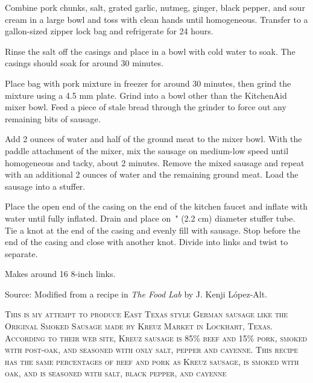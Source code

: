 \documentclass[letterpaper]{recipePMG}
\newcommand{\seveneights}{\nicefrac{7}{8} \,}
\begin{document}

Combine pork chunks, salt, grated garlic, nutmeg, ginger, black pepper, and sour cream in a large bowl and toss with clean hands until homogeneous. Transfer to a gallon-sized zipper lock bag and refrigerate for 24 hours.

Rinse the salt off the casings and place in a bowl with cold water to soak.  The casings should soak for around 30 minutes.

Place bag with pork mixture in freezer for around 30 minutes, then grind the mixture using a 4.5 mm plate. Grind into a bowl other than the KitchenAid mixer bowl. Feed a piece of stale bread through the grinder to force out any remaining bits of sausage. 


Add 2 ounces of water and half of the ground meat to the mixer bowl. With the paddle attachment of the mixer, mix the sausage on medium-low speed until homogeneous and tacky, about 2 minutes. Remove the mixed sausage and repeat with an additional 2 ounces of water and the remaining ground meat. Load the sausage into a stuffer. 

Place the open end of the casing on the end of the kitchen faucet and inflate with water until fully inflated. Drain and place on \seveneights" (2.2 cm) diameter stuffer tube. Tie a knot at the end of the casing and evenly fill with sausage. Stop before the end of the casing and close with another knot.  Divide into links and twist to separate. 

Makes around 16 8-inch links.

Source: Modified from a recipe in \textit{The Food Lab} by J. Kenji L\'{o}pez-Alt.

\newpage
{}
\label{TexasSausage}

\textsc{This is my attempt to produce East Texas style German sausage like the Original Smoked Sausage made by Kreuz Market in Lockhart, Texas. According to their web site, Kreuz sausage is 85\% beef and 15\% pork, smoked with post-oak, and seasoned with only salt, pepper and cayenne. This recipe has the same percentages of beef and pork as Kreuz sausage, is smoked with oak, and is seasoned with salt, black pepper, and cayenne}
\end{document}
